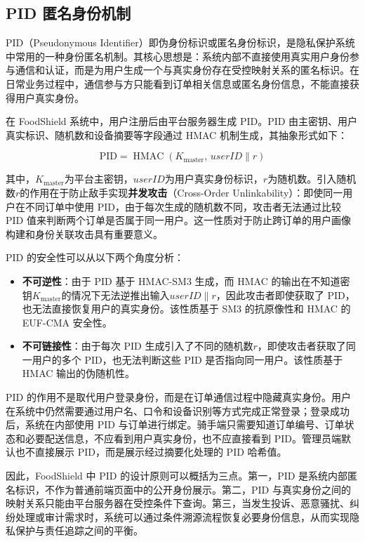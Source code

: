 \subsection{PID 匿名身份机制}

PID（Pseudonymous Identifier）即伪身份标识或匿名身份标识，是隐私保护系统中常用的一种身份匿名机制。其核心思想是：系统内部不直接使用真实用户身份参与通信和认证，而是为用户生成一个与真实身份存在受控映射关系的匿名标识。在日常业务过程中，通信参与方只能看到订单相关信息或匿名身份信息，不能直接获得用户真实身份。

在 FoodShield 系统中，用户注册后由平台服务器生成 PID。PID 由主密钥、用户真实标识、随机数和设备摘要等字段通过 HMAC 机制生成，其抽象形式如下：

\begin{equation}
\mathrm{PID}=\operatorname{HMAC}(K_{\mathrm{master}},\, \mathit{userID} \parallel r)
\end{equation}

其中，$K_{\mathrm{master}}$为平台主密钥，$\mathit{userID}$为用户真实身份标识，$r$为随机数。引入随机数$r$的作用在于防止敌手实现\textbf{并发攻击}（Cross-Order Unlinkability）：即使同一用户在不同订单中使用 PID，由于每次生成的随机数不同，攻击者无法通过比较 PID 值来判断两个订单是否属于同一用户。这一性质对于防止跨订单的用户画像构建和身份关联攻击具有重要意义。

PID 的安全性可以从以下两个角度分析：

\begin{itemize}[leftmargin=2em]
\item \textbf{不可逆性}：由于 PID 基于 HMAC-SM3 生成，而 HMAC 的输出在不知道密钥$K_{\mathrm{master}}$的情况下无法逆推出输入$\mathit{userID} \parallel r$，因此攻击者即使获取了 PID，也无法直接恢复用户的真实身份。该性质基于 SM3 的抗原像性和 HMAC 的 EUF-CMA 安全性。
\item \textbf{不可链接性}：由于每次 PID 生成引入了不同的随机数$r$，即使攻击者获取了同一用户的多个 PID，也无法判断这些 PID 是否指向同一用户。该性质基于 HMAC 输出的伪随机性。
\end{itemize}

PID 的作用不是取代用户登录身份，而是在订单通信过程中隐藏真实身份。用户在系统中仍然需要通过用户名、口令和设备识别等方式完成正常登录；登录成功后，系统在内部使用 PID 与订单进行绑定。骑手端只需要知道订单编号、订单状态和必要配送信息，不应看到用户真实身份，也不应直接看到 PID。管理员端默认也不直接展示 PID，而是展示经过摘要化处理的 PID 哈希值。

因此，FoodShield 中 PID 的设计原则可以概括为三点。第一，PID 是系统内部匿名标识，不作为普通前端页面中的公开身份展示。第二，PID 与真实身份之间的映射关系只能由平台服务器在受控条件下查询。第三，当发生投诉、恶意骚扰、纠纷处理或审计需求时，系统可以通过条件溯源流程恢复必要身份信息，从而实现隐私保护与责任追踪之间的平衡。
